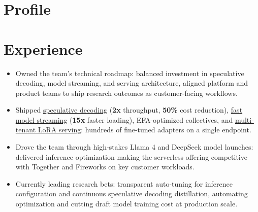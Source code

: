 \documentclass[11pt,letterpaper,sans]{resume}
\begin{document}
\makecvtitle

\section[E2C8]{Profile}


\section[E0EE]{Experience}


\begin{itemize}
\item Owned the team's technical roadmap: balanced investment in speculative decoding, model streaming, and serving architecture, aligned platform and product teams to ship research outcomes as customer-facing workflows.
\item Shipped \href{https://aws.amazon.com/blogs/machine-learning/achieve-up-to-2x-higher-throughput-while-reducing-costs-by-50-for-generative-ai-inference-on-amazon-sagemaker-with-the-new-inference-optimization-toolkit-part-1/}{speculative decoding} (\textbf{2x} throughput, \textbf{50\%} cost reduction), \href{https://aws.amazon.com/blogs/machine-learning/introducing-fast-model-loader-in-sagemaker-inference-accelerate-autoscaling-for-your-large-language-models-llms-part-1/}{fast model streaming} (\textbf{15x} faster loading), EFA-optimized collectives, and \href{https://aws.amazon.com/blogs/machine-learning/efficient-and-cost-effective-multi-tenant-lora-serving-with-amazon-sagemaker/}{multi-tenant LoRA serving}: hundreds of fine-tuned adapters on a single endpoint.
\item Drove the team through high-stakes Llama 4 and DeepSeek model launches: delivered inference optimization making the serverless offering competitive with Together and Fireworks on key customer workloads.
\item Currently leading research bets: transparent auto-tuning for inference configuration and continuous speculative decoding distillation, automating optimization and cutting draft model training cost at production scale.
\end{itemize}
\end{document}
